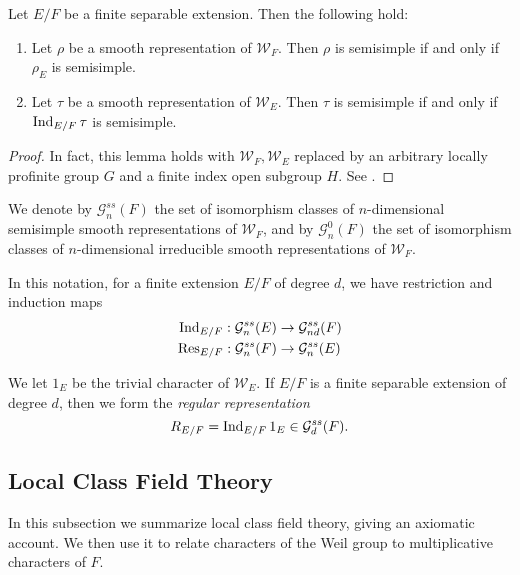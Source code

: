 \begin{lemma}
	Let $E/F$ be a finite separable extension. Then the following hold:
	\begin{enumerate}
		\item Let $\rho$ be a smooth representation of $\mathcal{W}_F$. Then $\rho$ is semisimple if and only if $\rho_E$ is semisimple.
		\item Let $\tau$ be a smooth representation of $\mathcal{W}_E$. Then $\tau$ is semisimple if and only if $\mathrm{Ind}_{E/F}\, \tau$ is semisimple.
	\end{enumerate}
\end{lemma}
\begin{proof}
	In fact, this lemma holds with $\mathcal{W}_F, \mathcal{W}_E$ replaced by an arbitrary locally profinite group $G$ and a finite index open subgroup $H$. See \cite[Lemma 2.7]{BH1}.
\end{proof}
\begin{notn}
	We denote by $\mathcal{G}^{ss}_n(F)$ the set of isomorphism classes of $n$-dimensional semisimple smooth representations of $\mathcal{W}_F$, and by $\mathcal{G}^0_n(F)$ the set of isomorphism classes of $n$-dimensional irreducible smooth representations of $\mathcal{W}_F$.
\end{notn}
In this notation, for a finite extension $E/F$ of degree $d$, we have restriction and induction maps
\begin{align*}
	\mathrm{Ind}_{E/F}: \mathcal{G}^{ss}_n(E) &\to \mathcal{G}^{ss}_{nd}(F)\\
	\mathrm{Res}_{E/F}: \mathcal{G}^{ss}_n(F) &\to \mathcal{G}^{ss}_n(E)
\end{align*}
\begin{notn}
	We let $1_E$ be the trivial character of $\mathcal{W}_E$. If $E/F$ is a finite separable extension of degree $d$, then we form the \emph{regular representation}
	\[R_{E/F} = \mathrm{Ind}_{E/F}\, 1_E\in \mathcal{G}_{d}^{ss}(F).\]
\end{notn}
\subsection{Local Class Field Theory}\label{sec:CFT}
In this subsection we summarize local class field theory, giving an axiomatic account. We then use it to relate characters of the Weil group to multiplicative characters of $F$.

